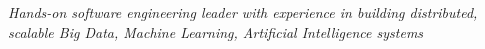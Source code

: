 \begin{cvparagraph}

  \vspace{4mm}
  \emph{Hands-on software engineering leader with experience in building distributed, scalable Big Data, Machine Learning, Artificial Intelligence systems}

\end{cvparagraph}
